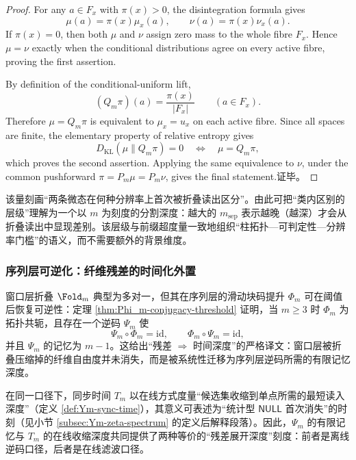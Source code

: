 \begin{proof}
For any \(a\in F_x\) with \(\pi(x)>0\), the disintegration formula gives
\[
\mu(a)=\pi(x)\mu_x(a),
\qquad
\nu(a)=\pi(x)\nu_x(a).
\]
If \(\pi(x)=0\), then both \(\mu\) and \(\nu\) assign zero mass to the whole fibre \(F_x\). Hence \(\mu=\nu\) exactly when the conditional distributions agree on every active fibre, proving the first assertion.

By definition of the conditional-uniform lift,
\[
(Q_m\pi)(a)=\frac{\pi(x)}{|F_x|}
\qquad(a\in F_x).
\]
Therefore \(\mu=Q_m\pi\) is equivalent to \(\mu_x=u_x\) on each active fibre. Since all spaces are finite, the elementary property of relative entropy gives
\[
D_{\mathrm{KL}}(\mu\|Q_m\pi)=0
\quad\Longleftrightarrow\quad
\mu=Q_m\pi,
\]
which proves the second assertion. Applying the same equivalence to \(\nu\), under the common pushforward \(
\pi=P_m\mu=P_m\nu\), gives the final statement.证毕。
\end{proof}

该量刻画“两条微态在何种分辨率上首次被折叠读出区分”。由此可把“类内区别的层级”理解为一个以 \(m\) 为刻度的分割深度：越大的 \(m_{\mathrm{sep}}\) 表示越晚（越深）才会从折叠读出中显现差别。该层级与前缀超度量一致地组织“柱拓扑—可判定性—分辨率门槛”的语义，而不需要额外的背景维度。

\subsubsection{序列层可逆化：纤维残差的时间化外置}\label{subsubsec:frt-sequence-inversion}
窗口层折叠 \(\Fold_m\) 典型为多对一，但其在序列层的滑动块码提升 \(\Phi_m\) 可在阈值后恢复可逆性：定理 \ref{thm:Phi_m-conjugacy-threshold} 证明，当 \(m\ge 3\) 时 \(\Phi_m\) 为拓扑共轭，且存在一个逆码 \(\Psi_m\) 使
\[
\Psi_m\circ\Phi_m=\mathrm{id},\qquad \Phi_m\circ\Psi_m=\mathrm{id},
\]
并且 \(\Psi_m\) 的记忆为 \(m-1\)。这给出“残差 \(\Rightarrow\) 时间深度”的严格译文：窗口层被折叠压缩掉的纤维自由度并未消失，而是被系统性迁移为序列层逆码所需的有限记忆深度。\par
在同一口径下，同步时间 \(T_m\) 以在线方式度量“候选集收缩到单点所需的最短读入深度”（定义 \ref{def:Ym-sync-time}），其意义可表述为“统计型 \(\mathsf{NULL}\) 首次消失”的时刻（见小节 \ref{subsec:Ym-zeta-spectrum} 的定义后解释段落）。因此，\(\Psi_m\) 的有限记忆与 \(T_m\) 的在线收缩深度共同提供了两种等价的“残差展开深度”刻度：前者是离线逆码口径，后者是在线滤波口径。

